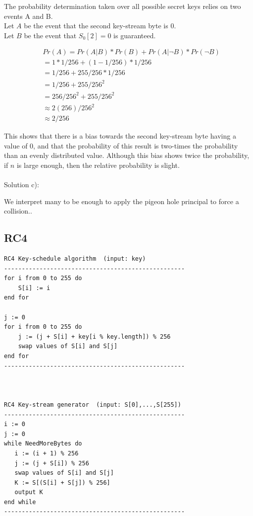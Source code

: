\documentclass[12pt, letterpaper]{article}
\begin{document}
The probability determination taken over all possible secret keys relies on two events A and B. \\
Let $A$ be the event that the second key-stream byte is 0.\\
Let $B$ be the event that $S_0[2]=0$ is guaranteed.

\begin{align*}
& Pr(A) = Pr(A|B) * Pr(B) + Pr(A|\neg B) * Pr(\neg B)\\
& = 1 * 1/256 + (1-1/256) * 1/256\\
& = 1/256 + 255/256 * 1/256\\
& = 1/256 + 255/256^2\\
& = 256/256^2 + 255/256^2\\
& \approx 2(256)/256^2\\
& \approx 2/256
\end{align*}

This shows that there is a bias towards the second key-stream byte having a value of 0, and that the probability of this result is two-times the probability than an evenly distributed value. Although this bias shows twice the probability, if $n$ is large enough, then the relative probability is slight.\\
\\
Solution c):

We interpret many to be enough to apply the pigeon hole principal to force a collision.. 

\clearpage

\appendix
\subsection*{RC4}


{\small
\begin{Verbatim}
RC4 Key-schedule algorithm  (input: key)
---------------------------------------------------
for i from 0 to 255 do
    S[i] := i
end for

j := 0
for i from 0 to 255 do
    j := (j + S[i] + key[i % key.length]) % 256
    swap values of S[i] and S[j]
end for
---------------------------------------------------



RC4 Key-stream generator  (input: S[0],...,S[255])
---------------------------------------------------
i := 0
j := 0
while NeedMoreBytes do
   i := (i + 1) % 256
   j := (j + S[i]) % 256
   swap values of S[i] and S[j]
   K := S[(S[i] + S[j]) % 256]
   output K
end while
---------------------------------------------------
\end{Verbatim}
}


\end{document}
